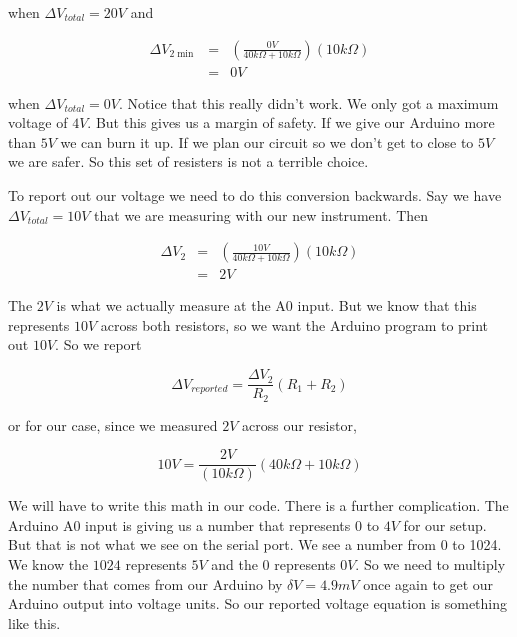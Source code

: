 \noindent when $\Delta V_{total}=20\unit{V}$ and 

\begin{eqnarray*}
\Delta V_{2\min } &=&\left( \frac{0\unit{V}}{40\unit{k \Omega}
	+10\unit{k\Omega}}\right) \left( 10\unit{k\Omega}\right) \\
	&=&0\unit{V}
\end{eqnarray*}

\noindent when $\Delta V_{total}=0\unit{V}.$ 
Notice that this really didn't work. We
only got a maximum voltage of $4\unit{V}.$ But this gives us a margin of safety. If we give our Arduino more than $5\unit{V}$ we can burn it up. If we plan our circuit so we don't get to close to $5\unit{V}$ we are safer. So this set of resisters is not a terrible choice.

To report out our voltage we need to do this conversion backwards. Say we have $\Delta V_{total}=10\unit{V}$ that we are measuring with our new instrument. Then 

\begin{eqnarray*}
	\Delta V_{2} &=&\left( \frac{10\unit{V}}{40\unit{k \Omega}
	+10\unit{k\Omega}}\right) \left( 10\unit{k\Omega}\right) \\
	&=&2\unit{V}
\end{eqnarray*}

The $2\unit{V}$ is what we actually measure at the A0 input. But we know
that this represents $10\unit{V}$ across both resistors, so we want the
Arduino program to print out $10\unit{V}.$ So we report

\begin{equation*}
	\Delta V_{reported}=\frac{\Delta V_{2}}{R_{2}}\left( R_{1}+R_{2}\right)
\end{equation*}

\noindent or for our case, since we measured $2\unit{V}$ across our resistor,

\begin{equation*}
	10\unit{V}=\frac{2\unit{V}}{\left( 10\unit{k\Omega}\right) }\left( 40\unit{k\Omega}+10\unit{k\Omega}\right)
\end{equation*}

We will have to write this math in our code. There is a further complication. The Arduino A0 input is giving us a number that represents $0$ to $4\unit{V}$ for our setup. But that is not what we see on the serial port. We see a number from 0 to 1024. We know the $1024$ represents $5\unit{V}$ and the $0$ represents $0\unit{V}.$ So we need to multiply the number that comes from our Arduino by $\delta V=4.9\unit{mV}$ once again to get our Arduino output into voltage units. So our reported voltage equation is something like this. 

